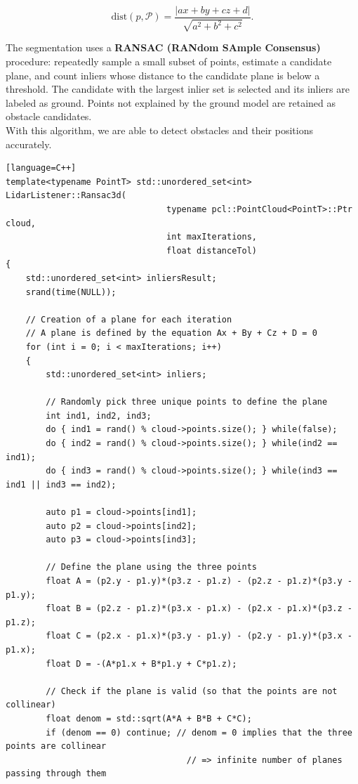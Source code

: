 $$
\mathrm{dist}(p,\mathcal{P}) = \frac{|a x + b y + c z + d|}{\sqrt{a^2 + b^2 + c^2}}.
$$

The segmentation uses a \textbf{RANSAC (RANdom SAmple Consensus)} procedure: repeatedly sample a small subset of points, estimate a candidate plane, and count inliers whose distance 
to the candidate plane is below a threshold. The candidate with the largest inlier set is selected and its inliers are labeled as ground. 
Points not explained by the ground model are retained as obstacle candidates. \\
With this algorithm, we are able to detect obstacles and their positions accurately.

\begin{lstlisting}[basicstyle=\ttfamily\scriptsize][language=C++]
template<typename PointT> std::unordered_set<int> LidarListener::Ransac3d(
                                typename pcl::PointCloud<PointT>::Ptr cloud, 
                                int maxIterations, 
                                float distanceTol)
{
    std::unordered_set<int> inliersResult;
    srand(time(NULL));

    // Creation of a plane for each iteration
    // A plane is defined by the equation Ax + By + Cz + D = 0
    for (int i = 0; i < maxIterations; i++)
    {
        std::unordered_set<int> inliers;

        // Randomly pick three unique points to define the plane
        int ind1, ind2, ind3;
        do { ind1 = rand() % cloud->points.size(); } while(false);
        do { ind2 = rand() % cloud->points.size(); } while(ind2 == ind1);
        do { ind3 = rand() % cloud->points.size(); } while(ind3 == ind1 || ind3 == ind2);

        auto p1 = cloud->points[ind1];
        auto p2 = cloud->points[ind2];
        auto p3 = cloud->points[ind3];

        // Define the plane using the three points
        float A = (p2.y - p1.y)*(p3.z - p1.z) - (p2.z - p1.z)*(p3.y - p1.y);
        float B = (p2.z - p1.z)*(p3.x - p1.x) - (p2.x - p1.x)*(p3.z - p1.z);
        float C = (p2.x - p1.x)*(p3.y - p1.y) - (p2.y - p1.y)*(p3.x - p1.x);
        float D = -(A*p1.x + B*p1.y + C*p1.z);

        // Check if the plane is valid (so that the points are not collinear)
        float denom = std::sqrt(A*A + B*B + C*C);
        if (denom == 0) continue; // denom = 0 implies that the three points are collinear 
                                    // => infinite number of planes passing through them


\end{lstlisting}
